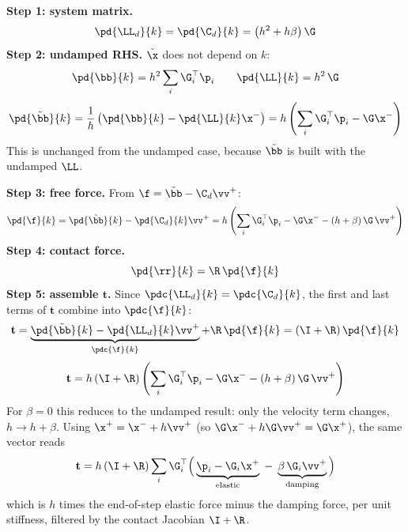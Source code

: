 \begin{derivation}
\textbf{Step 1: system matrix.}
\begin{equation*}
    \pd{\LL_d}{k} = \pd{\C_d}{k} = \left(h^2 + h\beta\right)\G
\end{equation*}
\textbf{Step 2: undamped RHS.} $\tilde\x$ does not depend on $k$:
\begin{equation*}
    \pd{\bb}{k} = h^2\sum_i\G_i^\top\p_i
    \qquad
    \pd{\LL}{k} = h^2\,\G
\end{equation*}
\begin{equation*}
    \pd{\tilde\bb}{k} = \frac1h\left(\pd{\bb}{k} - \pd{\LL}{k}\x^-\right) = h\left(\sum_i\G_i^\top\p_i - \G\x^-\right)
\end{equation*}
This is unchanged from the undamped case, because $\tilde\bb$ is built with the undamped $\LL$.

\textbf{Step 3: free force.} From $\f = \tilde\bb - \C_d\vv^+$:
\begin{equation*}
    \pd{\f}{k} = \pd{\tilde\bb}{k} - \pd{\C_d}{k}\vv^+
    = h\left(\sum_i\G_i^\top\p_i - \G\x^- - \left(h + \beta\right)\G\,\vv^+\right)
\end{equation*}
\textbf{Step 4: contact force.}
\begin{equation*}
    \pd{\rr}{k} = \R\,\pd{\f}{k}
\end{equation*}
\textbf{Step 5: assemble $\mathbf{t}$.} Since $\pdc{\LL_d}{k} = \pdc{\C_d}{k}$, the first and last terms of $\mathbf{t}$ combine into $\pdc{\f}{k}$:
\begin{equation*}
    \mathbf{t}
    = \underbrace{\pd{\tilde\bb}{k} - \pd{\LL_d}{k}\vv^+}_{\pdc{\f}{k}} + \R\,\pd{\f}{k}
    = (\I+\R)\,\pd{\f}{k}
\end{equation*}
\begin{equation}
    \mathbf{t}
    = h\,(\I+\R)\left(
        \sum_i \G_i^\top\p_i
        - \G\x^-
        - \left(h + \beta\right)\G\,\vv^+
      \right)
\end{equation}
For $\beta = 0$ this reduces to the undamped result: only the velocity term changes, $h \to h + \beta$.
\newline Using $\x^+ = \x^- + h\vv^+$ (so $\G\x^- + h\G\vv^+ = \G\x^+$), the same vector reads
\begin{equation*}
    \mathbf{t} = h\,(\I+\R)\sum_i\G_i^\top\Big(\underbrace{\p_i - \G_i\x^+}_{\text{elastic}} \;-\; \underbrace{\beta\,\G_i\vv^+}_{\text{damping}}\Big)
\end{equation*}
which is $h$ times the end-of-step elastic force minus the damping force, per unit stiffness, filtered by the contact Jacobian $\I + \R$.


\end{derivation}
